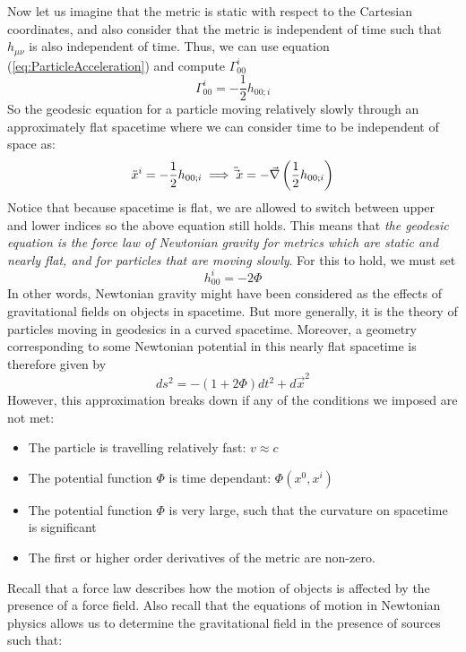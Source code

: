 \documentclass{article}
\begin{document}
 		Now let us imagine that the metric is static with respect to the Cartesian coordinates, and also consider that the metric is independent of time such that $h_{\mu\nu}$ is also independent of time. Thus, we can use equation (\ref{eq:ParticleAcceleration}) and compute $\Gamma_{00}^i$
 		\begin{equation}
 			\label{eq:ChristoffelAcceleration}
 			\Gamma_{00}^i = - \frac12 h_{00;i}
 		\end{equation}
 		So the geodesic equation for a particle moving relatively slowly through an approximately flat spacetime where we can consider time to be independent of space as:
 		$$ 
 			\ddot{x}^i = -\frac12 h_{00;i} \implies \ddot\vec{x} = -\vec{\nabla} \left( \frac12 h_{00;i} \right) 
 		$$
 		Notice that because spacetime is flat, we are allowed to switch between upper and lower indices so the above equation still holds. This means that \textit{the geodesic equation is the force law of Newtonian gravity for metrics which are static and nearly flat, and for particles that are moving slowly}. For this to hold, we must set
 		\begin{equation}
 			\label{eq:GravityForce}
 			h_{00}^i = -2 \Phi
 		\end{equation}
 		In other words, Newtonian gravity might have been considered as the effects of gravitational fields on objects in spacetime. But more generally, it is the theory of particles moving in geodesics in a curved spacetime. Moreover, a geometry corresponding to some Newtonian potential in this nearly flat spacetime is therefore given by
 		\begin{equation}
 			\label{eq:NewtonianGeometry}
 			ds^2 = - \left( 1 + 2 \Phi \right) dt^2 + d\vec{x}^2
 		\end{equation}
 		However, this approximation breaks down if any of the conditions we imposed are not met:
 		\begin{itemize}
 			\item The particle is travelling relatively fast: $v \approx c$
 			\item The potential function $\Phi$ is time dependant: $\Phi(x^0,x^i)$
 			\item The potential function $\Phi$ is very large, such that the curvature on spacetime is significant
 			\item The first or higher order derivatives of the metric are non-zero.
 		\end{itemize}
 		Recall that a force law describes how the motion of objects is affected by the presence of a force field. Also recall that the equations of motion in Newtonian physics allows us to determine the gravitational field in the presence of sources such that:
\end{document}
